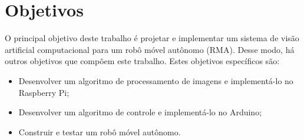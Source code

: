 \section{Objetivos}
\label{sec:objt}

O principal objetivo deste trabalho é projetar e implementar um sistema de visão artificial computacional para um robô móvel autônomo (RMA). Desse modo, há outros objetivos que compõem este trabalho. Estes objetivos específicos são:

\begin{itemize}
    \item Desenvolver um algoritmo de processamento de imagens e implementá-lo no Raspberry Pi;
    \item Desenvolver um algoritmo de controle e implementá-lo no Arduino;
    \item Construir e testar um robô móvel autônomo.
\end{itemize}








